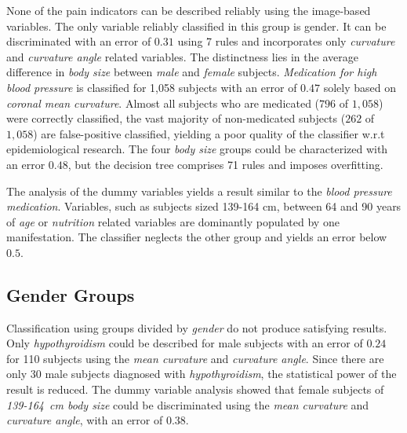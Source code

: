 \documentclass[a4paper,twoside]{style/article}
\begin{document}
None of the pain indicators can be described reliably using the image-based variables.
The only variable reliably classified in this group is gender. %
%
It can be discriminated with an error of $0.31$ using 7 rules and incorporates only \emph{curvature} and \emph{curvature angle} related variables.
The distinctness lies in the average difference in \emph{body size} between \emph{male} and \emph{female} subjects.
%
\emph{Medication for high blood pressure} is classified for 1,058 subjects with an error of $0.47$ solely based on \emph{coronal mean curvature}.
Almost all subjects who are medicated ($796$ of $1,058$) were correctly classified, the vast majority of non-medicated subjects ($262$ of $1,058$) are false-positive classified, yielding a poor quality of the classifier w.r.t epidemiological research.
The four \emph{body size} groups could be characterized with an error $0.48$, but the decision tree comprises 71 rules and imposes overfitting.

The analysis of the dummy variables yields a result similar to the \emph{blood pressure medication}.
Variables, such as subjects sized 139-164 cm, between 64 and 90 years of \emph{age} or \emph{nutrition} related variables are dominantly populated by one manifestation.
The classifier neglects the other group and yields an error below $0.5$.
\subsection{Gender Groups}
Classification using groups divided by \emph{gender} do not produce satisfying results.
Only \emph{hypothyroidism} could be described for male subjects with an error of $0.24$ for 110 subjects using the \emph{mean curvature} and \emph{curvature angle}.
Since there are only 30 male subjects diagnosed with \emph{hypothyroidism}, the statistical power of the result is reduced.
The dummy variable analysis showed that female subjects of \emph{139-164~cm body size} could be discriminated using the \emph{mean curvature} and \emph{curvature angle}, with an error of $0.38$.
\end{document}
